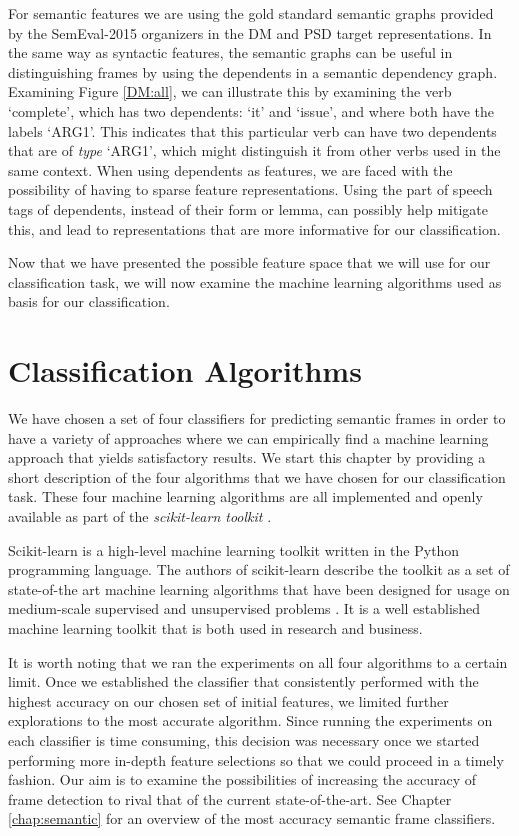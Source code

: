 For semantic features we are using the gold standard semantic graphs provided by the SemEval-2015 organizers in the DM and PSD target representations. In the same way as syntactic features, the semantic graphs can be useful in distinguishing frames by using the dependents in a semantic dependency graph. Examining Figure \ref{DM:all}, we can illustrate this by examining the verb `complete', which has two dependents: `it' and `issue', and where both have the labels `ARG1'. This indicates that this particular verb can have two dependents that are of \textit{type} `ARG1', which might distinguish it from other verbs used in the same context. When using dependents as features, we are faced with the possibility of having to sparse feature representations. Using the part of speech tags of dependents, instead of their form or lemma, can possibly help mitigate this, and lead to representations that are more informative for our classification.

Now that we have presented the possible feature space that we will use for our classification task, we will now examine the machine learning algorithms used as basis for our classification.

 
\section{Classification Algorithms}

We have chosen a set of four classifiers for predicting semantic frames in order to have a variety of approaches where we can empirically find a machine learning approach that yields satisfactory results. We start this chapter by providing a short description of the four algorithms that we have chosen for our classification task. These four machine learning algorithms are all implemented and openly available as part of the \textit{scikit-learn toolkit} \cite{scikit-learn}.

Scikit-learn is a high-level machine learning toolkit written in the Python programming language. The authors of scikit-learn describe the toolkit as a set of state-of-the art machine learning algorithms that have been designed for usage on medium-scale supervised and unsupervised problems \cite{scikit-learn}. It is a well established machine learning toolkit that is both used in research and business.

It is worth noting that we ran the experiments on all four algorithms to a certain limit. Once we established the classifier that consistently performed with the highest accuracy on our chosen set of initial features, we limited further explorations to the most accurate algorithm. Since running the experiments on each classifier is time consuming, this decision was necessary once we started performing more in-depth feature selections so that we could proceed in a timely fashion. Our aim is to examine the possibilities of increasing the accuracy of frame detection to rival that of the current state-of-the-art. See Chapter \ref{chap:semantic} for an overview of the most accuracy semantic frame classifiers.

